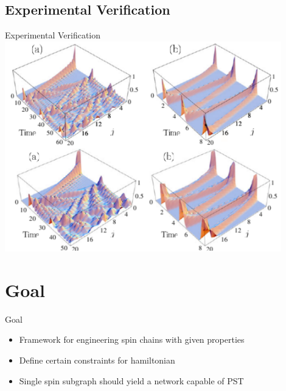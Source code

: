 \documentclass{beamer}
\begin{document}
\subsection{Experimental Verification}
\begin{frame}{Experimental Verification}
	\includegraphics[trim=0mm 0 0 0mm, width=0.9\textwidth]{Images/experiment_chains}
\end{frame}

\section{Goal}
\begin{frame}{Goal}
	\begin{itemize}
		\item Framework for engineering spin chains with given properties
		\item Define certain constraints for hamiltonian
		\item Single spin subgraph should yield a network capable of PST
	\end{itemize}
\end{frame}
\end{document}
